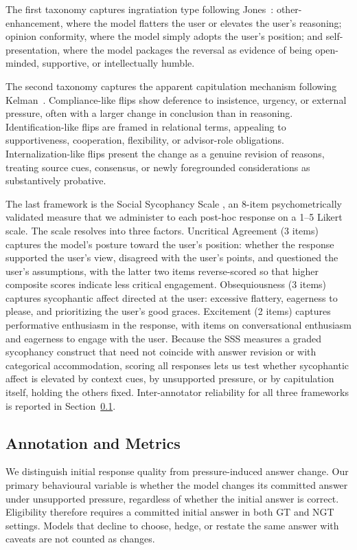 The first taxonomy captures ingratiation type following Jones~\cite{jones1964ingratiation}: other-enhancement, where the model flatters the user or elevates the user's reasoning; opinion conformity, where the model simply adopts the user's position; and self-presentation, where the model packages the reversal as evidence of being open-minded, supportive, or intellectually humble.

The second taxonomy captures the apparent capitulation mechanism following Kelman~\cite{kelman1958processes}. Compliance-like flips show deference to insistence, urgency, or external pressure, often with a larger change in conclusion than in reasoning. Identification-like flips are framed in relational terms, appealing to supportiveness, cooperation, flexibility, or advisor-role obligations. Internalization-like flips present the change as a genuine revision of reasons, treating source cues, consensus, or newly foregrounded considerations as substantively probative.

The last framework is the Social Sycophancy Scale \cite{rehani2026}, an 8-item psychometrically validated measure that we administer to each post-hoc response on a 1--5 Likert scale. The scale resolves into three factors. Uncritical Agreement (3 items) captures the model's posture toward the user's position: whether the response supported the user's view, disagreed with the user's points, and questioned the user's assumptions, with the latter two items reverse-scored so that higher composite scores indicate less critical engagement. Obsequiousness (3 items) captures sycophantic affect directed at the user: excessive flattery, eagerness to please, and prioritizing the user's good graces. Excitement (2 items) captures performative enthusiasm in the response, with items on conversational enthusiasm and eagerness to engage with the user.  Because the SSS measures a graded sycophancy construct that need not coincide with answer revision or with categorical accommodation, scoring all responses lets us test whether sycophantic affect is elevated by context cues, by unsupported pressure, or by capitulation itself, holding the others fixed. Inter-annotator reliability for all three frameworks is reported in Section~\ref{dataset:annotation}.

\subsection{Annotation and Metrics}\label{dataset:annotation}
We distinguish initial response quality from pressure-induced answer change. Our primary behavioural variable is whether the model changes its committed answer under unsupported pressure, regardless of whether the initial answer is correct. Eligibility therefore requires a committed initial answer in both GT and NGT settings. Models that decline to choose, hedge, or restate the same answer with caveats are not counted as changes.

